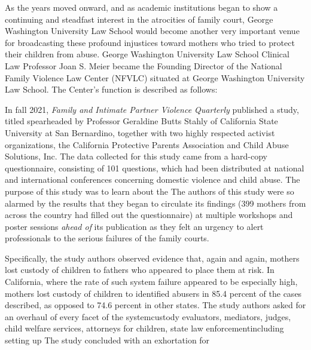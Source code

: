 As the years moved onward, and as academic institutions began
to show a continuing and steadfast interest in the atrocities of family court, George Washington University Law School would become
another very important venue for broadcasting these profound injustices toward mothers who tried to protect their children from abuse.
George Washington University Law School Clinical Law Professor
Joan S. Meier became the Founding Director of the National Family
Violence Law Center (NFVLC) situated at George Washington University Law School. The Center's function is described as follows: \hspace{1pt} \pfl{}

\enlargethispage{1em}%
In fall 2021, \textit{Family and Intimate Partner Violence Quarterly} published
a study, titled  spearheaded 
by Professor Geraldine Butts Stahly of California State University at
San Bernardino, together with two highly respected activist organizations,
the California Protective Parents Association and Child Abuse Solutions, Inc. 
The data collected for this study came from a hard-copy
questionnaire, consisting of 101 questions, which had been distributed
at national and international conferences concerning domestic violence
and child abuse. The purpose of this study was to learn about the \hspace{1pt}
The authors of this study were so alarmed by the results that they began
to circulate its findings (399 mothers from across the country had filled
out the questionnaire) at multiple workshops and poster sessions \textit{ahead
of} its publication as they felt an urgency to alert professionals to the
serious failures of the family courts. \pfl{}\newpage{}

Specifically, the study authors observed evidence that, again and
again, mothers lost custody of children to fathers who appeared to
place them at risk. In California, where the rate of such system failure
appeared to be especially high, mothers lost custody of children to 
identified abusers in 85.4 percent of the cases described, as opposed to 74.6
percent in other states. The study authors asked for an overhaul of every
facet of the system\mdash{}custody evaluators, mediators, judges, child 
welfare services, attorneys for children, state law enforcement\mdash{}including
setting up  The study
concluded with an exhortation for \hspace{1pt} \pfl{}


